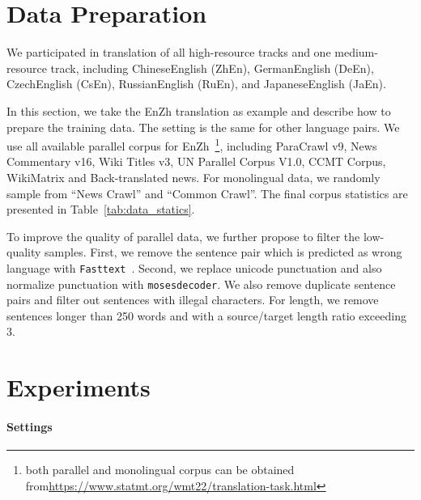 \documentclass[11pt,a4paper]{article}
\begin{document}
\section{Data Preparation}
\label{sec:data}
We participated in translation of all high-resource tracks and one medium-resource track, including ChineseEnglish (ZhEn), GermanEnglish (DeEn), CzechEnglish (CsEn), RussianEnglish (RuEn), and JapaneseEnglish (JaEn). 

In this section, we take the EnZh translation as example and describe how to prepare the training data. The setting is the same for other language pairs.
We use all available parallel corpus for EnZh~\footnote{both parallel and monolingual corpus can be obtained from\url{https://www.statmt.org/wmt22/translation-task.html}}, including ParaCrawl v9, News Commentary v16, Wiki Titles v3, UN Parallel Corpus V1.0, CCMT Corpus, WikiMatrix and Back-translated news. For monolingual data, we randomly sample from ``News Crawl'' and ``Common Crawl''. The final corpus statistics are presented in Table~\ref{tab:data_statics}.

To improve the quality of parallel data, we further propose to filter the low-quality samples.
First, we remove the sentence pair which is predicted as wrong language with  \texttt{Fasttext}~\cite{joulin-etal-2017-bag, joulin2016fasttext}. 
Second, we replace unicode punctuation and also normalize punctuation with \texttt{mosesdecoder}. 
We also remove duplicate sentence pairs and filter out sentences with illegal characters.
For length, we remove sentences longer than 250 words and with a source/target length ratio exceeding 3.


\section{Experiments}
\label{sec:exp}
\paragraph{Settings}
 
\end{document}

